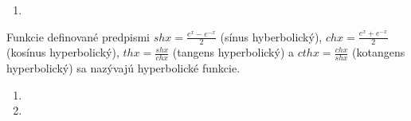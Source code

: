 \begin{enumerate}[resume]
  \item {}
\end{enumerate}

Funkcie definované predpismi $sh x=\frac{e^x-e^{-x}}{2}$ (sínus hyberbolický), $ch x=\frac{e^x+e^{-x}}{2}$ (kosínus hyperbolický), $th x=\frac{sh x}{ch x}$ (tangens hyperbolický) a $cth x=\frac{ch x}{sh x}$ (kotangens hyperbolický) sa nazývajú hyperbolické funkcie.

\begin{enumerate}[resume]
  \item {}
  \item {}
\end{enumerate}

